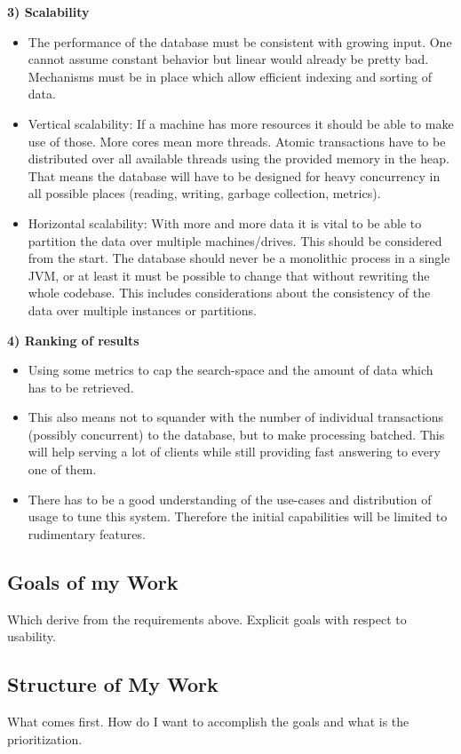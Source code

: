 \documentclass[11p]{scrartcl}
\begin{document}
\textbf{3) Scalability}
\begin{itemize}
	\item The performance of the database must be consistent with growing input. One cannot assume constant behavior but linear would already be pretty bad. Mechanisms must be in place which allow efficient indexing and sorting of data.	
	\item Vertical scalability: If a machine has more resources it should be able to make use of those. More cores mean more threads. Atomic transactions have to be distributed over all available threads using the  provided memory in the heap. That means the database will have to be designed for heavy concurrency in all possible places (reading, writing, garbage collection, metrics).
	\item Horizontal scalability: With more and more data it is vital to be able to partition the data over multiple machines/drives. This should be considered from the start. The database should never be a monolithic process in a single JVM, or at least it must be possible to change that without rewriting the whole codebase. This includes considerations about the consistency of the data over multiple instances or partitions.
\end{itemize}

\textbf{4) Ranking of results} \\
\begin{itemize}
	\item Using some metrics to cap the search-space and the amount of data which has to be retrieved.
	\item This also means not to squander with the number of individual transactions (possibly concurrent) to the database, but to make processing batched. This will help serving a lot of clients while still providing fast answering to every one of them.
	\item There has to be a good understanding of the use-cases and distribution of usage to tune this system. Therefore the initial capabilities will be limited to rudimentary features.
\end{itemize}
  

\subsection{Goals of my Work}
Which derive from the requirements above. Explicit goals with respect to usability.


\subsection{Structure of My Work}
What comes first. How do I want to accomplish the goals and what is the prioritization.
\end{document}
